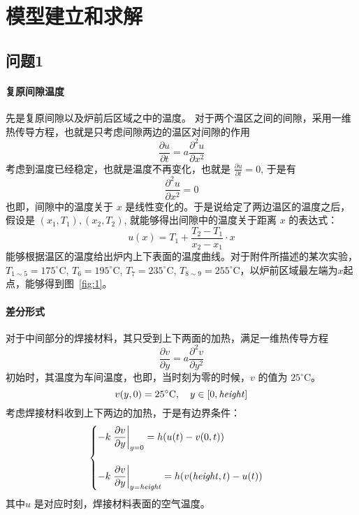 \documentclass[../main.tex]{subfiles}
\begin{document}
\section{模型建立和求解}
\subsection{问题1}
\paragraph{复原间隙温度} 先是复原间隙以及炉前后区域之中的温度。
对于两个温区之间的间隙，采用一维热传导方程，也就是只考虑间隙两边的温区对间隙的作用
\begin{equation}
\frac{\partial u}{\partial t} = a \frac{\partial ^{2} u}{ \partial x ^{2}}
\end{equation}
考虑到温度已经稳定，也就是温度不再变化，也就是 \(\frac{\partial u}{ \partial t} = 0\), 于是有
\begin{equation}
\frac{\partial ^{2} u}{\partial x ^{2}} = 0
\end{equation}
也即，间隙中的温度关于 \(x\) 是线性变化的。于是说给定了两边温区的温度之后，假设是 \((x_1, T_1), (x_2, T_2)\), 就能够得出间隙中的温度关于距离 \(x\) 的表达式：
\[
u(x)  = T_{1} + \frac{T_2 - T_1}{x_2 - x_1} \cdot x
\]
能够根据温区的温度给出炉内上下表面的温度曲线。对于附件所描述的某次实验，\(T _{1 \sim 5} = 17 5 ^{\circ}\mathrm{C}\), \(T _{6} = 195 ^{\circ}\mathrm{C}\), \(T _{7} = 235 ^{\circ}\mathrm{C}\), \(T _{8 \sim 9} = 255 ^{\circ}\mathrm{C}\)，以炉前区域最左端为\(x\)起点，能够得到图~\ref{fig:1}。


\paragraph{差分形式} 对于中间部分的焊接材料，其只受到上下两面的加热，满足一维热传导方程
\begin{equation}
\frac{\partial v}{\partial y} = a \frac{\partial ^{2} v}{ \partial y ^{2}} \label{equ:one-dim}
\end{equation}
初始时，其温度为车间温度，也即，当时刻为零的时候，\(v\) 的值为 \(25 ^{\circ}\mathrm{C}\)。
\begin{equation}
v (y, 0) = 25 ^{\circ}\mathrm{C}, \quad y \in [0, {\it height}]
\end{equation}
考虑焊接材料收到上下两边的加热，于是有边界条件：
\begin{equation}\label{equ:bian}
\begin{cases}
\displaystyle- k \left.\frac{\partial v}{\partial y}\right|_{y = 0} =  h (u(t) - v(0, t)) \\
\\
\displaystyle- k \left.\frac{\partial v}{\partial y}\right|_{y = {\it height}} = h (v({\it height}, t) - u(t))
\end{cases}
\end{equation}
其中\(u\) 是对应时刻，焊接材料表面的空气温度。
\end{document}
